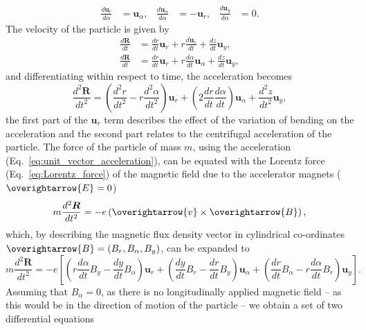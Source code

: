 \documentclass[../main.tex]{subfiles}
\begin{document}
\begin{align}
\frac{d\boldsymbol{u}_{r}}{d\alpha} &= \boldsymbol{u}_{\alpha}, & \frac{d\boldsymbol{u}_{\alpha}}{d\alpha} &= -\boldsymbol{u}_{r}, & \frac{d\boldsymbol{u}_{y}}{d\alpha} &= 0.
\label{eq:unit_vector_angular_derivatives}    
\end{align}
The velocity of the particle is given by
\begin{align}
\frac{d\boldsymbol{R}}{dt} &= \frac{dr}{dt}\boldsymbol{u}_{r}+r\frac{d\boldsymbol{u}_{r}}{dt} +\frac{dz}{dt}\boldsymbol{u}_{y}, \nonumber \\
\frac{d\boldsymbol{R}}{dt} &= \frac{dr}{dt}\boldsymbol{u}_{r} + r\frac{d\alpha}{dt}\boldsymbol{u}_{\alpha} + \frac{dz}{dt}\boldsymbol{u}_{y},
\label{eq:unit_vector_velocity}    
\end{align}
and differentiating within respect to time, the acceleration becomes
\begin{equation}
\frac{d^{2}\boldsymbol{R}}{dt^{2}} = \left(\frac{d^{2}r}{dt^{2}}-r\frac{d^{2}\alpha}{dt^{2}}\right)\boldsymbol{u}_{r} + \left(2\frac{dr}{dt}\frac{d\alpha}{dt}\right)\boldsymbol{u}_{\alpha} + \frac{d^{2}z}{dt^{2}}\boldsymbol{u}_{y},
\label{eq:unit_vector_acceleration}    
\end{equation}
the first part of the $\boldsymbol{u}_{r}$ term describes the effect of the variation of bending on the acceleration and the second part relates to the centrifugal acceleration of the particle. The force of the particle of mass $m$, using the acceleration (Eq.~\ref{eq:unit_vector_acceleration}), can be equated with the Lorentz force (Eq.~\ref{eq:Lorentz_force}) of the magnetic field due to the accelerator magnets ($\overightarrow{E}=0$)
\begin{equation}
m\frac{d^{2}\boldsymbol{R}}{dt^{2}}=-e\left(\overightarrow{v}\times\overightarrow{B}\right),
\label{eq:Lorentz_particle_equating_forces}
\end{equation}
which, by describing the magnetic flux density vector in cylindrical co-ordinates $\overightarrow{B} = \left(B_{r},B_{\alpha},B_{y}\right)$, can be expanded to
\begin{equation}
m\frac{d^{2}\boldsymbol{R}}{dt^{2}} = -e\left[\left(r\frac{d\alpha}{dt}B_{y}-\frac{dy}{dt}B_{\alpha}\right)\boldsymbol{u}_{r}+\left(\frac{dy}{dt}B_{r}-\frac{dr}{dt}B_{y}\right)\boldsymbol{u}_{\alpha}+\left(\frac{dr}{dt}B_{\alpha}-r\frac{d\alpha}{dt}B_{r}\right)\boldsymbol{u}_{y}\right].
\label{eq:Lorentz_particle_equating_forces_expanded}    
\end{equation}
Assuming that $B_{\alpha}=0$, as there is no longitudinally applied magnetic field -- as this would be in the direction of motion of the particle -- we obtain a set of two differential equations
\end{document}
